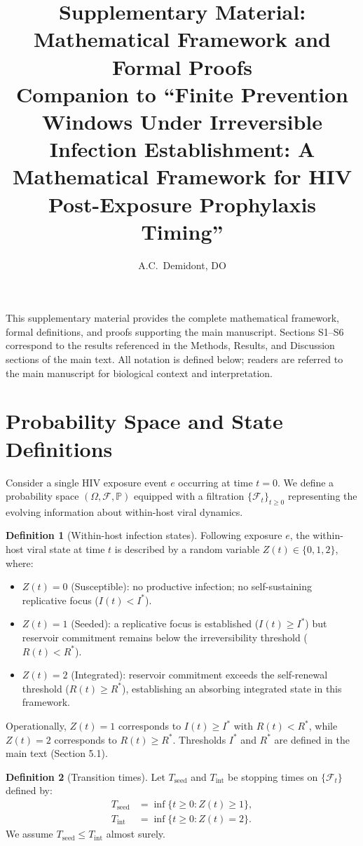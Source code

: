 \documentclass[12pt,a4paper]{article}
\title{Supplementary Material:\\
Mathematical Framework and Formal Proofs\\[6pt]
\large Companion to ``Finite Prevention Windows Under Irreversible Infection Establishment: A Mathematical Framework for HIV Post-Exposure Prophylaxis Timing''}
\author{A.C.\ Demidont, DO}
\date{}
\theoremstyle{plain}
\theoremstyle{definition}
\newtheorem{definition}{Definition}
\theoremstyle{remark}
\newcommand{\Prob}{\mathbb{P}}
\begin{document}
\maketitle

\noindent This supplementary material provides the complete mathematical framework, formal definitions, and proofs supporting the main manuscript. Sections S1--S6 correspond to the results referenced in the Methods, Results, and Discussion sections of the main text. All notation is defined below; readers are referred to the main manuscript for biological context and interpretation.


\section{Probability Space and State Definitions}\label{sec:S1}
\setcounter{theorem}{0}
\setcounter{definition}{0}
\setcounter{assumption}{0}

Consider a single HIV exposure event $e$ occurring at time $t = 0$. We define a probability space $(\Omega, \mathcal{F}, \Prob)$ equipped with a filtration $\{\mathcal{F}_t\}_{t \geq 0}$ representing the evolving information about within-host viral dynamics.

\begin{definition}[Within-host infection states]\label{def:S-states}
Following exposure $e$, the within-host viral state at time $t$ is described by a random variable $Z(t) \in \{0,1,2\}$, where:
\begin{itemize}
\item $Z(t)=0$ (Susceptible): no productive infection; no self-sustaining replicative focus ($I(t) < I^{*}$).
\item $Z(t)=1$ (Seeded): a replicative focus is established ($I(t) \ge I^{*}$) but reservoir commitment remains below the irreversibility threshold ($R(t) < R^{*}$).
\item $Z(t)=2$ (Integrated): reservoir commitment exceeds the self-renewal threshold ($R(t) \ge R^{*}$), establishing an absorbing integrated state in this framework.
\end{itemize}
Operationally, $Z(t)=1$ corresponds to $I(t) \ge I^{*}$ with $R(t) < R^{*}$, while $Z(t)=2$ corresponds to $R(t) \ge R^{*}$. Thresholds $I^{*}$ and $R^{*}$ are defined in the main text (Section 5.1).

\end{definition}

\begin{definition}[Transition times]\label{def:S-stopping}
Let $T_{\mathrm{seed}}$ and $T_{\mathrm{int}}$ be stopping times on $\{\mathcal{F}_t\}$ defined by:
\begin{align}
    T_{\mathrm{seed}} &= \inf\{t \geq 0 : Z(t) \geq 1\}, \label{eq:S-Tseed}\\
    T_{\mathrm{int}} &= \inf\{t \geq 0 : Z(t) = 2\}. \label{eq:S-Tint}
\end{align}
We assume $T_{\mathrm{seed}} \leq T_{\mathrm{int}}$ almost surely.
\end{definition}
\end{document}
